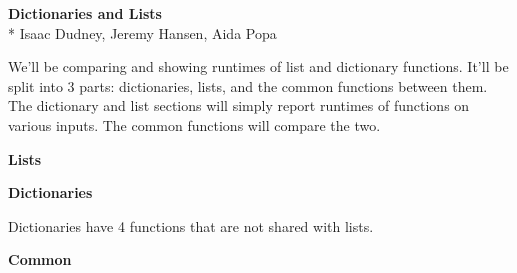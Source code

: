 \documentclass[11pt]{article}
\begin{document}
\noindent
\textbf{Dictionaries and Lists}\\*
Isaac Dudney, Jeremy Hansen, Aida Popa

We'll be comparing and showing runtimes of list and dictionary functions.
It'll be split into 3 parts: dictionaries, lists, and the common functions between them.
The dictionary and list sections will simply report runtimes of functions on various inputs.
The common functions will compare the two.

\noindent
\textbf{Lists}


\noindent
\textbf{Dictionaries}

Dictionaries have 4 functions that are not shared with lists.


\noindent
\textbf{Common}
\end{document}
